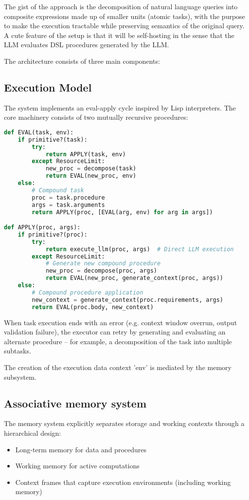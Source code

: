 \documentclass{article}
\begin{document}
The gist of the approach is the decomposition of natural language queries into composite expressions made up of smaller units (atomic tasks), with the purpose to make the execution tractable while preserving semantics of the original query. A cute feature of the setup is that it will be self-hosting in the sense that the LLM evaluates DSL procedures generated by the LLM.

The architecture consists of three main components:

\subsection{Execution Model}
The system implements an eval-apply cycle inspired by Lisp interpreters. The core machinery consists of two mutually recursive procedures:

\begin{lstlisting}[language=Python, caption=Core Evaluation Functions]
def EVAL(task, env):
    if primitive?(task):
        try:
            return APPLY(task, env)
        except ResourceLimit:
            new_proc = decompose(task)
            return EVAL(new_proc, env)
    else:
        # Compound task
        proc = task.procedure
        args = task.arguments
        return APPLY(proc, [EVAL(arg, env) for arg in args])

def APPLY(proc, args):
    if primitive?(proc):
        try:
            return execute_llm(proc, args)  # Direct LLM execution
        except ResourceLimit:
            # Generate new compound procedure
            new_proc = decompose(proc, args)
            return EVAL(new_proc, generate_context(proc, args))
    else:
        # Compound procedure application
        new_context = generate_context(proc.requirements, args)
        return EVAL(proc.body, new_context)
\end{lstlisting}

When task execution ends with an error (e.g. context window overrun, output validation failure), the executor can retry by generating and evaluating an alternate procedure -- for example, a decomposition of the task into multiple subtasks.

The creation of the execution data context 'env' is mediated by the memory subsystem.

\subsection{Associative memory system}
The memory system explicitly separates storage and working contexts through a hierarchical design:
\begin{itemize}
    \item Long-term memory for data and procedures
    \item Working memory for active computations
    \item Context frames that capture execution environments (including working memory)
\end{itemize}
\end{document}
